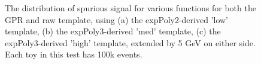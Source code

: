 \begin{figure} 
\begin{center}

\caption{The distribution of spurious signal for various functions for both the GPR and raw template, using (a) the expPoly2-derived 'low' template, (b) the expPoly3-derived 'med' template, (c) the expPoly3-derived 'high' template, extended by 5 GeV on either side. Each toy in this test has 100k events.}
\label{fig:padded_lowpt_100k_noSig}
\end{center}
\end{figure}

